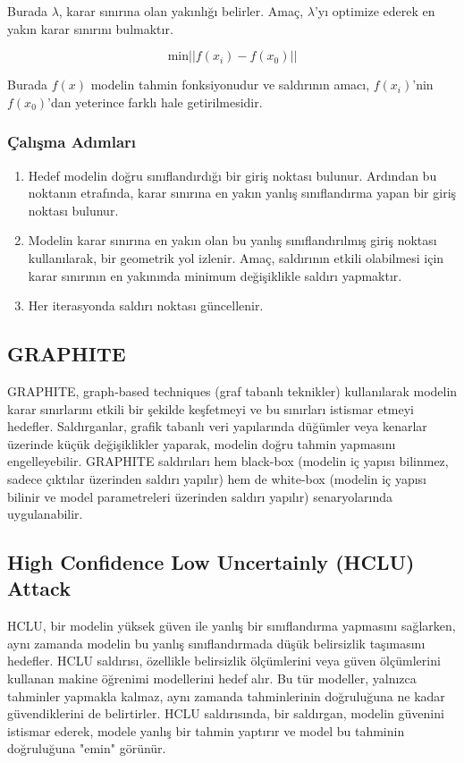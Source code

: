 Burada $\lambda$, karar sınırına olan yakınlığı belirler. Amaç, $\lambda$'yı optimize ederek en yakın karar sınırını bulmaktır.

\[ \text{min} || f(x_i) - f(x_0) || \]

Burada $f(x)$ modelin tahmin fonksiyonudur ve saldırının amacı, $f(x_i)$'nin $f(x_0)$'dan yeterince farklı hale getirilmesidir.

\subsubsection{Çalışma Adımları}

\begin{enumerate}
    \item Hedef modelin doğru sınıflandırdığı bir giriş noktası bulunur. Ardından bu noktanın etrafında, karar sınırına en yakın yanlış sınıflandırma yapan bir giriş noktası bulunur.
    \item Modelin karar sınırına en yakın olan bu yanlış sınıflandırılmış giriş noktası kullanılarak, bir geometrik yol izlenir. Amaç, saldırının etkili olabilmesi için karar sınırının en yakınında minimum değişiklikle saldırı yapmaktır.
    \item Her iterasyonda saldırı noktası güncellenir.
\end{enumerate}

\newpage

\subsection{GRAPHITE}

GRAPHITE, graph-based techniques (graf tabanlı teknikler) kullanılarak modelin karar sınırlarını etkili bir şekilde keşfetmeyi ve bu sınırları istismar etmeyi hedefler. Saldırganlar, grafik tabanlı veri yapılarında düğümler veya kenarlar üzerinde küçük değişiklikler yaparak, modelin doğru tahmin yapmasını engelleyebilir. GRAPHITE saldırıları hem black-box (modelin iç yapısı bilinmez, sadece çıktılar üzerinden saldırı yapılır) hem de white-box (modelin iç yapısı bilinir ve model parametreleri üzerinden saldırı yapılır) senaryolarında uygulanabilir.

\newpage

\subsection{High Confidence Low Uncertainly (HCLU) Attack}

HCLU, bir modelin yüksek güven ile yanlış bir sınıflandırma yapmasını sağlarken, aynı zamanda modelin bu yanlış sınıflandırmada düşük belirsizlik taşımasını hedefler. HCLU saldırısı, özellikle belirsizlik ölçümlerini veya güven ölçümlerini kullanan makine öğrenimi modellerini hedef alır. Bu tür modeller, yalnızca tahminler yapmakla kalmaz, aynı zamanda tahminlerinin doğruluğuna ne kadar güvendiklerini de belirtirler. HCLU saldırısında, bir saldırgan, modelin güvenini istismar ederek, modele yanlış bir tahmin yaptırır ve model bu tahminin doğruluğuna "emin" görünür.

